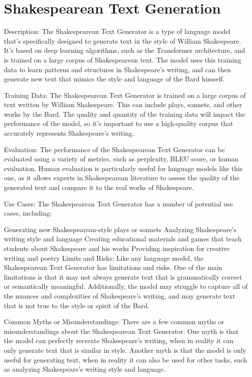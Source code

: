 \section{Shakespearean Text Generation } 

Description:
The Shakespearean Text Generator is a type of language model that's specifically designed to generate text in the style of William Shakespeare. It's based on deep learning algorithms, such as the Transformer architecture, and is trained on a large corpus of Shakespearean text. The model uses this training data to learn patterns and structures in Shakespeare's writing, and can then generate new text that mimics the style and language of the Bard himself.

Training Data:
The Shakespearean Text Generator is trained on a large corpus of text written by William Shakespeare. This can include plays, sonnets, and other works by the Bard. The quality and quantity of the training data will impact the performance of the model, so it's important to use a high-quality corpus that accurately represents Shakespeare's writing.

Evaluation:
The performance of the Shakespearean Text Generator can be evaluated using a variety of metrics, such as perplexity, BLEU score, or human evaluation. Human evaluation is particularly useful for language models like this one, as it allows experts in Shakespearean literature to assess the quality of the generated text and compare it to the real works of Shakespeare.

Use Cases:
The Shakespearean Text Generator has a number of potential use cases, including:

Generating new Shakespearean-style plays or sonnets
Analyzing Shakespeare's writing style and language
Creating educational materials and games that teach students about Shakespeare and his works
Providing inspiration for creative writing and poetry
Limits and Risks:
Like any language model, the Shakespearean Text Generator has limitations and risks. One of the main limitations is that it may not always generate text that is grammatically correct or semantically meaningful. Additionally, the model may struggle to capture all of the nuances and complexities of Shakespeare's writing, and may generate text that is not true to the style or spirit of the Bard.

Common Myths or Misunderstandings:
There are a few common myths or misunderstandings about the Shakespearean Text Generator. One myth is that the model can perfectly recreate Shakespeare's writing, when in reality it can only generate text that is similar in style. Another myth is that the model is only useful for generating text, when in reality it can also be used for other tasks, such as analyzing Shakespeare's writing style and language.

